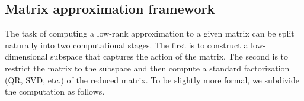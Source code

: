 \documentclass[final]{siamltex}
\newcounter{algorithm}[section]
\begin{document}


\subsection{Matrix approximation framework}
\label{sec:framework}
The task of computing a low-rank approximation to a given matrix
can be split naturally into two computational stages. The first is
to construct a low-dimensional subspace that captures the action
of the matrix. The second is to restrict the matrix to the subspace
and then compute a standard factorization (QR, SVD, etc.) of the
reduced matrix.  To be slightly more formal, we subdivide the
computation as follows.

\lsp
\end{document}
